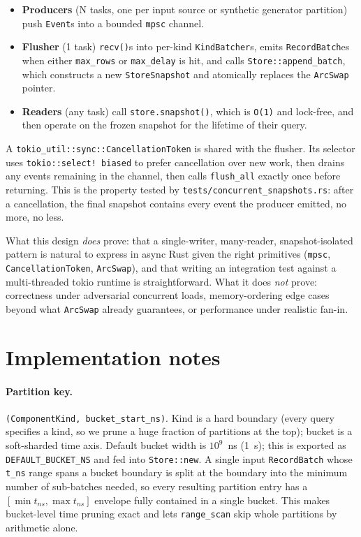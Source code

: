\documentclass[11pt]{article}
\begin{document}
\begin{itemize}
  \item \textbf{Producers} (N tasks, one per input source or synthetic generator
    partition) push \texttt{Event}s into a bounded \texttt{mpsc} channel.
  \item \textbf{Flusher} (1 task) \texttt{recv()}s into per-kind
    \texttt{KindBatcher}s, emits \texttt{RecordBatch}es when either
    \texttt{max\_rows} or \texttt{max\_delay} is hit, and calls
    \texttt{Store::append\_batch}, which constructs a new \texttt{StoreSnapshot} and
    atomically replaces the \texttt{ArcSwap} pointer.
  \item \textbf{Readers} (any task) call \texttt{store.snapshot()}, which is
    \texttt{O(1)} and lock-free, and then operate on the frozen snapshot for the
    lifetime of their query.
\end{itemize}

A \texttt{tokio\_util::sync::CancellationToken} is shared with the flusher. Its
selector uses \texttt{tokio::select!\ biased} to prefer cancellation over new work,
then drains any events remaining in the channel, then calls \texttt{flush\_all} exactly
once before returning. This is the property tested by
\texttt{tests/concurrent\_snapshots.rs}: after a cancellation, the final snapshot
contains every event the producer emitted, no more, no less.

What this design \emph{does} prove: that a single-writer, many-reader, snapshot-isolated
pattern is natural to express in async Rust given the right primitives (\texttt{mpsc},
\texttt{CancellationToken}, \texttt{ArcSwap}), and that writing an integration test
against a multi-threaded tokio runtime is straightforward. What it does \emph{not}
prove: correctness under adversarial concurrent loads, memory-ordering edge cases beyond
what \texttt{ArcSwap} already guarantees, or performance under realistic fan-in.

\section{Implementation notes}

\paragraph{Partition key.} \texttt{(ComponentKind, bucket\_start\_ns)}. Kind is a
hard boundary (every query specifies a kind, so we prune a huge fraction of partitions
at the top); bucket is a soft-sharded time axis. Default bucket width is $10^9$~ns
(1~s); this is exported as \texttt{DEFAULT\_BUCKET\_NS} and fed into
\texttt{Store::new}. A single input \texttt{RecordBatch} whose \texttt{t\_ns} range
spans a bucket boundary is split at the boundary into the minimum number of sub-batches
needed, so every resulting partition entry has a $[\min t_{ns}, \max t_{ns}]$ envelope
fully contained in a single bucket. This makes bucket-level time pruning exact and
lets \texttt{range\_scan} skip whole partitions by arithmetic alone.
\end{document}
